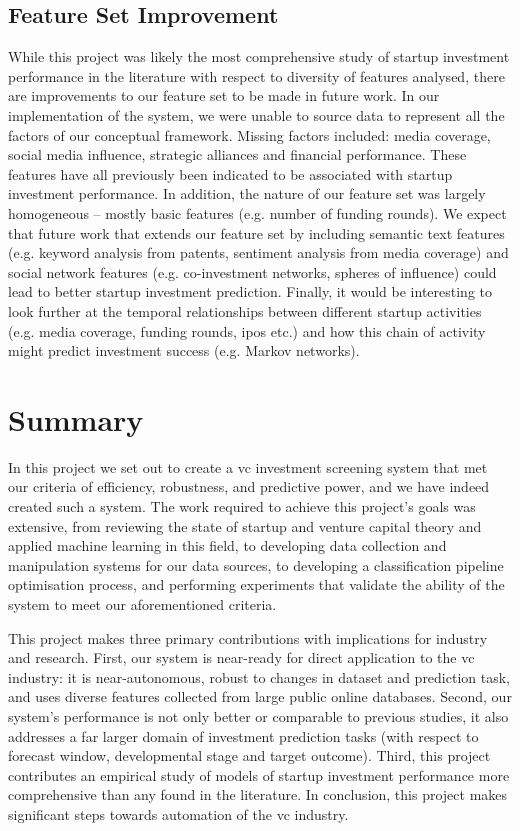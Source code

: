 \documentclass[../thesis/thesis.tex]{subfiles}
\begin{document}
\subsection{Feature Set Improvement}

While this project was likely the most comprehensive study of startup investment performance in the literature with respect to diversity of features analysed, there are improvements to our feature set to be made in future work. In our implementation of the system, we were unable to source data to represent all the factors of our conceptual framework. Missing factors included: media coverage, social media influence, strategic alliances and financial performance. These features have all previously been indicated to be associated with startup investment performance. In addition, the nature of our feature set was largely homogeneous -- mostly basic features (e.g. number of funding rounds). We expect that future work that extends our feature set by including semantic text features (e.g. keyword analysis from patents, sentiment analysis from media coverage) and social network features (e.g. co-investment networks, spheres of influence) could lead to better startup investment prediction. Finally, it would be interesting to look further at the temporal relationships between different startup activities (e.g. media coverage, funding rounds, \gls{ipo}s etc.) and how this chain of activity might predict investment success (e.g. Markov networks).

\section{Summary}

In this project we set out to create a \gls{vc} investment screening system that met our criteria of efficiency, robustness, and predictive power, and we have indeed created such a system. The work required to achieve this project's goals was extensive, from reviewing the state of startup and venture capital theory and applied machine learning in this field, to developing data collection and manipulation systems for our data sources, to developing a classification pipeline optimisation process, and performing experiments that validate the ability of the system to meet our aforementioned criteria.

This project makes three primary contributions with implications for industry and research. First, our system is near-ready for direct application to the \gls{vc} industry: it is near-autonomous, robust to changes in dataset and prediction task, and uses diverse features collected from large public online databases. Second, our system's performance is not only better or comparable to previous studies, it also addresses a far larger domain of investment prediction tasks (with respect to forecast window, developmental stage and target outcome). Third, this project contributes an empirical study of models of startup investment performance more comprehensive than any found in the literature. In conclusion, this project makes significant steps towards automation of the \gls{vc} industry.

\end{document}
